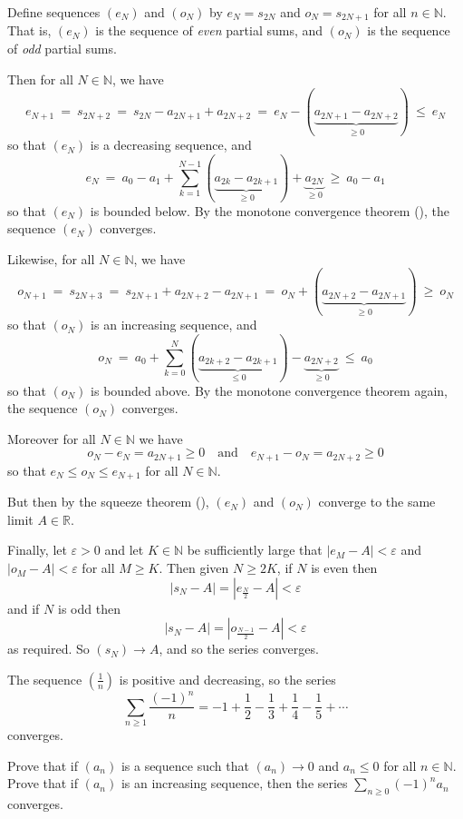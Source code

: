 \begin{cproof}
Define sequences $(e_N)$ and $(o_N)$ by $e_N = s_{2N}$ and $o_N = s_{2N+1}$ for all $n \in \mathbb{N}$. That is, $(e_N)$ is the sequence of \textit{even} partial sums, and $(o_N)$ is the sequence of \textit{odd} partial sums.

Then for all $N \in \mathbb{N}$, we have
\[ e_{N+1} ~=~ s_{2N+2} ~=~ s_{2N} - a_{2N+1} + a_{2N+2} ~=~ e_N - (\underbrace{a_{2N+1}-a_{2N+2}}_{\ge 0}) ~\le~ e_N \]
so that $(e_N)$ is a decreasing sequence, and
\[ e_N ~=~ a_0 - a_1 + \sum_{k=1}^{N-1} (\underbrace{a_{2k} - a_{2k+1}}_{\ge 0}) + \underbrace{a_{2N}}_{\ge 0} ~\ge~ a_0-a_1 \]
so that $(e_N)$ is bounded below. By the monotone convergence theorem (), the sequence $(e_N)$ converges.

Likewise, for all $N \in \mathbb{N}$, we have
\[ o_{N+1} ~=~ s_{2N+3} ~=~ s_{2N+1} + a_{2N+2} - a_{2N+1} ~=~ o_N + (\underbrace{a_{2N+2} - a_{2N+1}}_{\ge 0}) ~\ge~ o_N \]
so that $(o_N)$ is an increasing sequence, and
\[ o_N ~=~ a_0 + \sum_{k=0}^N (\underbrace{a_{2k+2} - a_{2k+1}}_{\le 0}) - \underbrace{a_{2N+2}}_{\ge 0} ~\le~ a_0 \]
so that $(o_N)$ is bounded above. By the monotone convergence theorem again, the sequence $(o_N)$ converges.

Moreover for all $N \in \mathbb{N}$ we have
\[ o_N - e_N = a_{2N+1} \ge 0 \quad \text{and} \quad e_{N+1} - o_N = a_{2N+2} \ge 0 \]
so that $e_N \le o_N \le e_{N+1}$ for all $N \in \mathbb{N}$.

But then by the squeeze theorem (), $(e_N)$ and $(o_N)$ converge to the same limit $A \in \mathbb{R}$.

Finally, let $\varepsilon > 0$ and let $K \in \mathbb{N}$ be sufficiently large that $|e_M - A| < \varepsilon$ and $|o_M - A| < \varepsilon$ for all $M \ge K$. Then given $N \ge 2K$, if $N$ is even then
\[ |s_N - A| = |e_{\frac{N}{2}} - A| < \varepsilon \]
and if $N$ is odd then
\[ |s_N - A| = |o_{\frac{N-1}{2}} - A| < \varepsilon \]
as required. So $(s_N) \to A$, and so the series converges.
\end{cproof}

\begin{example}
\label{exAlternatingHarmonicSeries}
The sequence $(\frac{1}{n})$ is positive and decreasing, so the series
\[ \sum_{n \ge 1} \dfrac{(-1)^n}{n} = -1 + \dfrac{1}{2} - \dfrac{1}{3} + \dfrac{1}{4} - \dfrac{1}{5} + \cdots \]
converges.
\end{example}

\begin{exercise}
Prove that if $(a_n)$ is a sequence such that $(a_n) \to 0$ and $a_n \le 0$ for all $n \in \mathbb{N}$. Prove that if $(a_n)$ is an increasing sequence, then the series $\displaystyle \sum_{n \ge 0} (-1)^n a_n$ converges.
\end{exercise}

